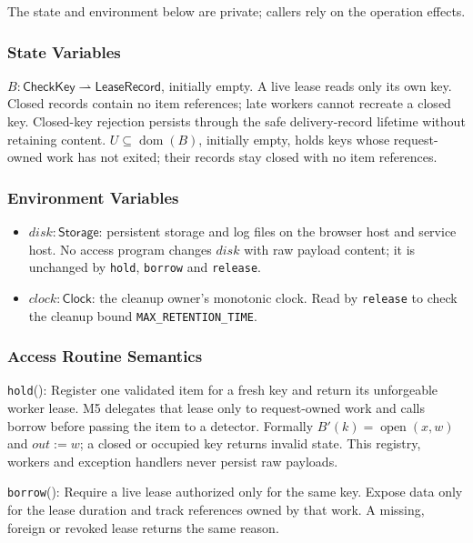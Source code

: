 \documentclass[12pt, titlepage]{article}
\newcommand{\ty}[1]{\textsf{#1}}
\newcommand{\key}{\ty{CheckKey}}
\newcommand{\Const}[1]{\texttt{#1}}
\begin{document}
The state and environment below are private; callers rely on the operation effects.

\subsubsection{State Variables}

$B:\key\rightharpoonup\ty{LeaseRecord}$, initially empty. A live lease reads only its own key. Closed records contain no item references; late workers cannot recreate a closed key. Closed-key rejection persists through the safe delivery-record lifetime without retaining content. $U\subseteq\operatorname{dom}(B)$, initially empty, holds keys whose request-owned work has not exited; their records stay closed with no item references.

\subsubsection{Environment Variables}

\begin{itemize}
\item $\mathit{disk}:\ty{Storage}$: persistent storage and log files on the browser host and service host. No access program changes $\mathit{disk}$ with raw payload content; it is unchanged by \texttt{hold}, \texttt{borrow} and \texttt{release}.
\item $\mathit{clock}:\ty{Clock}$: the cleanup owner's monotonic clock. Read by \texttt{release} to check the cleanup bound \Const{MAX\_\allowbreak{}RETENTION\_\allowbreak{}TIME}.
\end{itemize}

\subsubsection{Access Routine Semantics}

\noindent \texttt{hold}():
Register one validated item for a fresh key and return its unforgeable worker lease. M5 delegates that lease only to request-owned work and calls borrow before passing the item to a detector. Formally $B'(k)=\operatorname{open}(x,w)$ and $out:=w$; a closed or occupied key returns invalid state. This registry, workers and exception handlers never persist raw payloads.

\medskip\noindent \texttt{borrow}():
Require a live lease authorized only for the same key. Expose data only for the lease duration and track references owned by that work. A missing, foreign or revoked lease returns the same reason.
\end{document}
